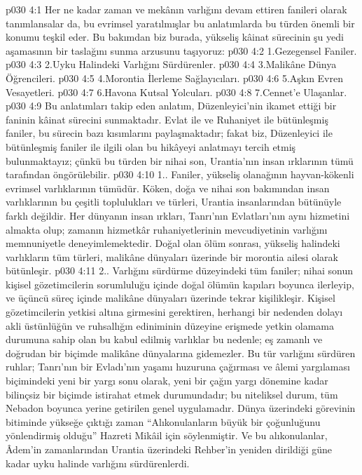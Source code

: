 \vs p030 4:1 Her ne kadar zaman ve mekânın varlığını devam ettiren fanileri  olarak tanımlansalar da, bu evrimsel yaratılmışlar bu anlatımlarda bu türden önemli bir konumu teşkil eder. Bu bakımdan biz burada, yükseliş kâinat sürecinin şu yedi aşamasının bir taslağını sunma arzusunu taşıyoruz:
\vs p030 4:2 1.\bibnobreakspace Gezegensel Faniler.
\vs p030 4:3 2.\bibnobreakspace Uyku Halindeki Varlığını Sürdürenler.
\vs p030 4:4 3.\bibnobreakspace Malikâne Dünya Öğrencileri.
\vs p030 4:5 4.\bibnobreakspace Morontia İlerleme Sağlayıcıları.
\vs p030 4:6 5.\bibnobreakspace Aşkın Evren Vesayetleri.
\vs p030 4:7 6.\bibnobreakspace Havona Kutsal Yolcuları.
\vs p030 4:8 7.\bibnobreakspace Cennet’e Ulaşanlar.
\vs p030 4:9 Bu anlatımları takip eden anlatım, Düzenleyici’nin ikamet ettiği bir faninin kâinat sürecini sunmaktadır. Evlat ile ve Ruhaniyet ile bütünleşmiş faniler, bu sürecin bazı kısımlarını paylaşmaktadır; fakat biz, Düzenleyici ile bütünleşmiş faniler ile ilgili olan bu hikâyeyi anlatmayı tercih etmiş bulunmaktayız; çünkü bu türden bir nihai son, Urantia’nın insan ırklarının tümü tarafından öngörülebilir.
\vs p030 4:10 1.\bibnobreakspace {}. Faniler, yükseliş olanağının hayvan\hyp{}kökenli evrimsel varlıklarının tümüdür. Köken, doğa ve nihai son bakımından insan varlıklarının bu çeşitli toplulukları ve türleri, Urantia insanlarından bütünüyle farklı değildir. Her dünyanın insan ırkları, Tanrı’nın Evlatları’nın aynı hizmetini almakta olup; zamanın hizmetkâr ruhaniyetlerinin mevcudiyetinin varlığını memnuniyetle deneyimlemektedir. Doğal olan ölüm sonrası, yükseliş halindeki varlıkların tüm türleri, malikâne dünyaları üzerinde bir morontia ailesi olarak bütünleşir.
\vs p030 4:11 2.\bibnobreakspace {}. Varlığını sürdürme düzeyindeki tüm faniler; nihai sonun kişisel gözetimcilerin sorumluluğu içinde doğal ölümün kapıları boyunca ilerleyip, ve üçüncü süreç içinde malikâne dünyaları üzerinde tekrar kişilikleşir. Kişisel gözetimcilerin yetkisi altına girmesini gerektiren, herhangi bir nedenden dolayı akli üstünlüğün ve ruhsallığın ediniminin düzeyine erişmede yetkin olamama durumuna sahip olan bu kabul edilmiş varlıklar bu nedenle; eş zamanlı ve doğrudan bir biçimde malikâne dünyalarına gidemezler. Bu tür varlığını sürdüren ruhlar; Tanrı’nın bir Evladı’nın yaşamı huzuruna çağırması ve âlemi yargılaması biçimindeki yeni bir yargı sonu olarak, yeni bir çağın yargı dönemine kadar bilinçsiz bir biçimde istirahat etmek durumundadır; bu niteliksel durum, tüm Nebadon boyunca yerine getirilen genel uygulamadır. Dünya üzerindeki görevinin bitiminde yükseğe çıktığı zaman “Alıkonulanların büyük bir çoğunluğunu yönlendirmiş olduğu” Hazreti Mikâil için söylenmiştir. Ve bu alıkonulanlar, Âdem’in zamanlarından Urantia üzerindeki Rehber’in yeniden dirildiği güne kadar uyku halinde varlığını sürdürenlerdi.
